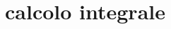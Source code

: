\chapter{calcolo integrale}

\begin{comment}

\section{misura di Peano-Jordan}

In questo capitolo vogliamo dare una definizione di \emph{misura} di un
sottoinsieme $A\subset \RR^n$ formalizzando le stesse nozioni che sostanzialmente
venivano già usate dagli antichi greci.
Lo faremo nel caso per noi più rilevante ovvero il caso planare $n=2$ in cui la \emph{misura}
di un insieme si chiama \emph{area}. Ma l'intera costruzione potrebbe essere fatta senza
nessuna difficoltà (se non per le notazioni che si complicano) nel caso generale della
dimensione $n$.

Dato un insieme $A\subset \RR^2$ vorremmo definire la sua area $m(A)\in \RR$
in modo che valgano le seguenti proprietà:
\begin{enumerate}
  \item se $A\cap B=\emptyset$ allora $m(A\cup B) = m(A) + m(B)$ (additività);
  \item se $A \subset B$ allora $m(A) \le m(B)$ (monotonia);
  \item se $A=[a_1,b_1]\times [a_2,b_2]$ (con $a_1\le b_1$, $a_2\le b_2$)
  allora $m(A) = (b_1-a_1)\cdot (b_2-a_2)$ (normalizzazione).
\end{enumerate}

Andremo a definire la misura $m$ su una famiglia di sottoinsiemi di $\RR^2$ che
chiameremo \emph{misurabili} secondo Peano-Jordan.
Si potrebbe dimostrare che non è possibile definire $m$ su tutti i sottoinsiemi di $\RR^2$
in modo che valgano le proprietà enunciate qui sopra. Sarebbe però possibile
definire la misura su una classe molto più amplia di insiemi, imponendo inoltre
l'additività non solo su unioni finite ma anche su unioni numerabili
($\sigma$ additività). Quello che si otterrebbe
è la cosiddetta misura di \emph{Lebesgue} che è ormai una costruzione standard
dell'analisi matematica ma ci richiederebbe una teoria molto più complessa da sviluppare.
Ci accontenteremo qui di introdurre la misura $m$ finitamente additiva di Peano-Jordan
che poi ci permetterà di dare significato geometrico all'integrale di Riemann.


\end{comment}
